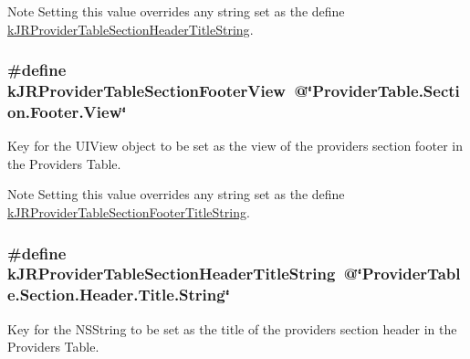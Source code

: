 \begin{DoxyNote}{Note}
Setting this value overrides any string set as the define \hyperlink{group__custom_interface_ga667a6c955993ec24292875f319a7d763}{kJRProviderTableSectionHeaderTitleString}. 
\end{DoxyNote}
\hypertarget{group__custom_interface_ga984c096e9258dea402a1c27ae8bb6c8f}{
\subsubsection[{kJRProviderTableSectionFooterView}]{\setlength{\rightskip}{0pt plus 5cm}\#define kJRProviderTableSectionFooterView~@\char`\"{}ProviderTable.Section.Footer.View\char`\"{}}}
\label{group__custom_interface_ga984c096e9258dea402a1c27ae8bb6c8f}
Key for the {\ttfamily UIView} object to be set as the view of the providers section footer in the Providers Table.

\begin{DoxyNote}{Note}
Setting this value overrides any string set as the define \hyperlink{group__custom_interface_ga72e63105251e7d4d6a363e279c2bf775}{kJRProviderTableSectionFooterTitleString}. 
\end{DoxyNote}
\hypertarget{group__custom_interface_ga667a6c955993ec24292875f319a7d763}{
\subsubsection[{kJRProviderTableSectionHeaderTitleString}]{\setlength{\rightskip}{0pt plus 5cm}\#define kJRProviderTableSectionHeaderTitleString~@\char`\"{}ProviderTable.Section.Header.Title.String\char`\"{}}}
\label{group__custom_interface_ga667a6c955993ec24292875f319a7d763}
Key for the {\ttfamily NSString} to be set as the title of the providers section header in the Providers Table.

